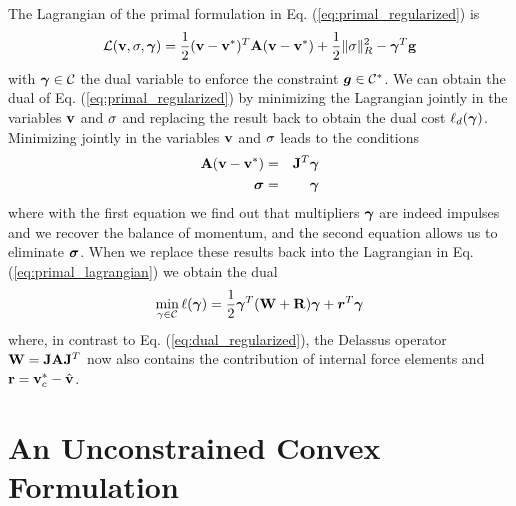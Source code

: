 

The Lagrangian of the primal formulation in Eq. (\ref{eq:primal_regularized}) is
\begin{equation}
	\mathcal{L}(\mf{v},\mf{\sigma},\vf{\gamma}) = \frac{1}{2}(\mf{v}-\mf{v}^*)^T\mf{A}(\mf{v}-\mf{v}^*) + \frac{1}{2} \Vert\mf\sigma\Vert_{R}^2 - \vf{\gamma}^T\mf{g}
	\label{eq:primal_lagrangian}
\end{equation}
with ${\bm{\gamma}}\in\mathcal{C}$ the dual variable to enforce the constraint
${\bm{g}}\in \mathcal{C}^*$. We can obtain the dual of Eq.
(\ref{eq:primal_regularized}) by minimizing the Lagrangian jointly in the
variables ${\mathbf{v}}$ and ${\mathbf{\sigma}}$ and replacing the result back to obtain the
dual cost $\ell_d({\bm{\gamma}})$. Minimizing jointly in the variables ${\mathbf{v}}$
and ${\mathbf{\sigma}}$ leads to the conditions
\begin{eqnarray}
	{\mathbf{A}}({\mathbf{v}}-{\mathbf{v}}^*) &=& {\mathbf{J}}^T{\bm{\gamma}}\\
	{\bm{\sigma}} &=& {\bm{\gamma}}
\end{eqnarray}
where with the first equation we find out that multipliers ${\bm\gamma}$ are indeed
impulses and we recover the balance of momentum, and the second equation allows
us to eliminate ${\bm{\sigma}}$. When we replace these results back into the
Lagrangian in Eq. (\ref{eq:primal_lagrangian}) we obtain the dual
\begin{eqnarray}
	\min_{\gamma\in \mathcal{C}} \ell(\bgamma) =
	\frac{1}{2}\bgamma^T(\mathbf{W}+\mathbf{R})\bgamma + {\bm r}^T
	\bgamma
	\label{eq:dual_regularized}
\end{eqnarray}
where, in contrast to Eq. (\ref{eq:dual_regularized}), the Delassus operator
${\mathbf{W}}={\mathbf{J}}{\mathbf{A}}{\mathbf{J}}^T$ now also contains the contribution of internal
force elements and ${\mathbf{r}}={\mathbf{v}}_c^*-\hat{{\mathbf{v}}}$.

\section{An Unconstrained Convex Formulation}
\label{sec:unconstrained_convex_formulation}

